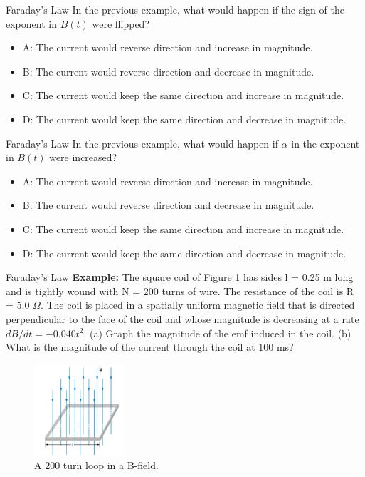 \documentclass{beamer}
\begin{document}
\begin{frame}{Faraday's Law}
In the previous example, what would happen if the sign of the exponent in $B(t)$ were flipped?
\begin{itemize}
\item A: The current would reverse direction and increase in magnitude.
\item B: The current would reverse direction and decrease in magnitude.
\item C: The current would keep the same direction and increase in magnitude.
\item D: The current would keep the same direction and decrease in magnitude.
\end{itemize}
\end{frame}

\begin{frame}{Faraday's Law}
In the previous example, what would happen if $\alpha$ in the exponent in $B(t)$ were increased?
\begin{itemize}
\item A: The current would reverse direction and increase in magnitude.
\item B: The current would reverse direction and decrease in magnitude.
\item C: The current would keep the same direction and increase in magnitude.
\item D: The current would keep the same direction and decrease in magnitude.
\end{itemize}
\end{frame}

\begin{frame}{Faraday's Law}
\small
\textbf{Example:}
The square coil of Figure \ref{fig:loop2} has sides l = 0.25 m long and is tightly wound with N = 200 turns of wire. The resistance of the coil is R = 5.0 $\Omega$. The coil is placed in a spatially uniform magnetic field that is directed perpendicular to the face of the coil and whose magnitude is decreasing at a rate $dB/dt = −0.040 t^2$. (a) Graph the magnitude of the emf induced in the coil. (b) What is the magnitude of the current through the coil at 100 ms?
\begin{figure}
\centering
\includegraphics[width=0.3\textwidth]{figures/loop1.png}
\caption{\label{fig:loop2} A 200 turn loop in a B-field.}
\end{figure}
\end{frame}
\end{document}
